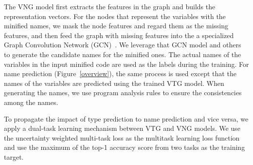 The VNG model first extracts the features in the graph and builds the
representation vectors. For the nodes that represent the variables
with the minified names, we mask the node features and regard them as
the missing features, and then feed the graph with missing features
into the a specialized Graph Convolution Network (GCN)~\cite{}. We
leverage that GCN model and others to generate the candidate names for
the minified ones. The actual names of the variables in the input
minified code are used as the labels during the training. For name
prediction (Figure~\ref{overview}), the same process is used except
that the names of the variables are predicted using the trained VTG
model. When generating the names, we use program analysis rules to
ensure the consistencies among the names.

To propagate the impact of type prediction to name prediction and vice
versa, we apply a dual-task learning mechanism between VTG and VNG
models.  We use the uncertainty weighted multi-task loss as the
multitask learning loss function and use the maximum of the top-1
accuracy score from two tasks as the training target.










